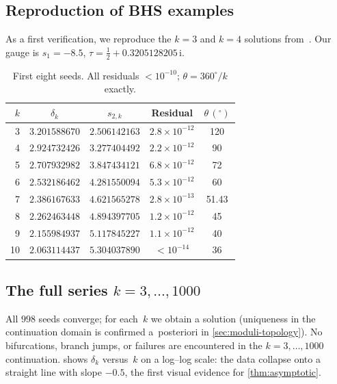 \documentclass[11pt,a4paper]{article}
\theoremstyle{plain}
\theoremstyle{definition}
\theoremstyle{remark}
\newcommand{\ii}{\mathrm{i}}
\begin{document}
\subsection{Reproduction of BHS examples}\label{sec:repro}
As a first verification, we reproduce the $k = 3$ and $k = 4$
solutions from~\cite{BHS25}.  Our gauge is $s_1 = -8.5$,
$\tau = \tfrac12 + 0.3205128205\,\ii$.

\begin{table}[ht]
\centering
\caption{First eight seeds.  All residuals
  $< 10^{-10}$; $\theta = 360^\circ/k$ exactly.}
\label{tab:first-seeds}
\smallskip
\begin{tabular}{@{}rcccc@{}}
\toprule
$k$ & $\delta_k$ & $s_{2,k}$ & Residual & $\theta\,(^\circ)$ \\
\midrule
3  & $3.201588670$ & $2.506142163$ & $2.8 \times 10^{-12}$ & 120 \\
4  & $2.924732426$ & $3.277404492$ & $2.2 \times 10^{-12}$ & 90 \\
5  & $2.707932982$ & $3.847434121$ & $6.8 \times 10^{-12}$ & 72 \\
6  & $2.532186462$ & $4.281550094$ & $5.3 \times 10^{-12}$ & 60 \\
7  & $2.386167633$ & $4.621565278$ & $2.8 \times 10^{-13}$ & 51.43 \\
8  & $2.262463448$ & $4.894397705$ & $1.2 \times 10^{-12}$ & 45 \\
9  & $2.155984937$ & $5.117845227$ & $1.1 \times 10^{-12}$ & 40 \\
10 & $2.063114437$ & $5.304037890$ & $< 10^{-14}$ & 36 \\
\bottomrule
\end{tabular}
\end{table}

\subsection{The full series \texorpdfstring{$k = 3,\ldots,1000$}{k = 3,...,1000}}
\label{sec:full-series}
All $998$ seeds converge; for each~$k$ we obtain a
solution (uniqueness in the continuation domain is
confirmed a~posteriori in \cref{sec:moduli-topology}).
No bifurcations, branch jumps, or
failures are encountered in the $k = 3,\ldots,1000$
continuation.
 shows $\delta_k$ versus~$k$
on a log--log scale: the data collapse onto a straight line with
slope $-0.5$, the first visual evidence for \cref{thm:asymptotic}.
\end{document}
